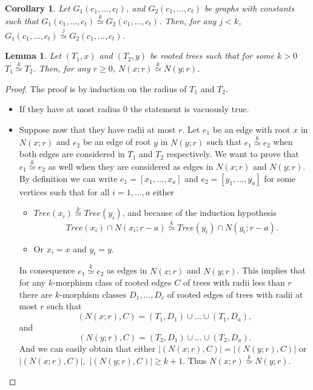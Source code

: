 \documentclass[11pt,notitlepage]{report}
\newtheorem{lemma}{Lemma}[chapter]
\newtheorem{corollary}{Corollary}[chapter]
\theoremstyle{definition}
\theoremstyle{remark}
\newcommand{\morph}[1]{\stackrel{#1}{\simeq}}
\begin{document}
\begin{corollary}
	Let $G_1(c_1,\dots, c_t)$, and $G_2(c_1,\dots,c_t)$ be graphs
	with constants such that $G_1(c_1,\dots, c_t)\morph{k}G_2(c_1,\dots,c_t)$.
	Then, for any $j<k$, $G_1(c_1,\dots, c_t)\morph{j}G_2(c_1,\dots,c_t)$.
\end{corollary}



\begin{lemma}
	Let $(T_1,x)$ and $(T_2,y)$ be rooted trees such that for some $k>0$ 
	$T_1 \morph{k} T_2$. Then, for any $r\geq 0$, $N(x;r)\morph{k} N(y;r)$.
\end{lemma}
\begin{proof}
	The proof is by induction on the radius of $T_1$ and $T_2$.
	\begin{itemize}
		\item If they have at most radius $0$ the statement is vacuously true. 
		\item Suppose now that they have radii at most $r$. Let $e_1$ be an edge with root
		$x$ in $N(x;r)$ and $e_2$ be an edge of root $y$ in $N(y;r)$ such that $e_1 \morph{k} e_2$
		when both edges are considered in $T_1$ and $T_2$ respectively. We want to prove that
		$e_1 \morph{k} e_2$ as well when they are considered as edges in $N(x;r)$ and $N(y;r)$.
		By definition we can write $e_1=[x_1,\dots,x_a]$ and 
		$e_2=[y_1,\dots,y_a]$ for some vertices such that for all
		$i=1,\dots, a$ either 
		\begin{itemize}
			\item $Tree(x_i)\morph{k} Tree(y_i)$, and because of the induction hypothesis 
			\[Tree(x_i)\cap N(x_i;r-a) \morph{k} Tree(y_i)\cap N(y_i;r-a).\] 
			\item Or $x_i=x$ and $y_i=y$.
		\end{itemize}
		In consequence $e_1 \morph{k} e_2$ as edges in $N(x;r)$ and $N(y;r)$. 
		This implies that for any $k$-morphism class of rooted edges $C$ of trees with
		radii less than $r$ there are $k$-morphism classes $D_1,\dots,D_c$ of rooted edges
		of trees with radii at most $r$ such that
		\[ (N(x;r),C) = (T_1, D_1)\cup \dots \cup (T_1,D_a), \]
		and 
		\[(N(y;r),C) = (T_2, D_1)\cup \dots \cup (T_2,D_a).\]
		And we can easily obtain that either
		$|(N(x;r),C)|=|(N(y;r),C)|$ or $|(N(x;r),C)|,$ $
		|(N(y;r),C)|\geq k+1$. 	Thus $N(x;r)\morph{k} N(y;r)$.
	\end{itemize}	
\end{proof}
\end{document}
